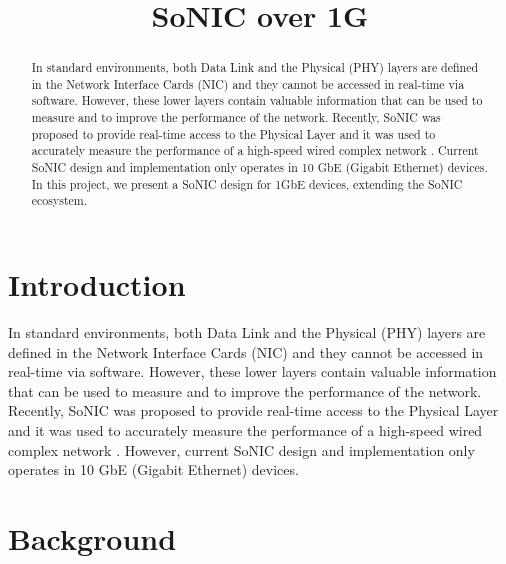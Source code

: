\documentclass[conference]{IEEEtran}
\begin{document}
%
\title{SoNIC over 1G}


\author{
}

\maketitle


\begin{abstract}

In standard environments, both Data Link and the Physical (PHY) layers are defined in the Network Interface Cards (NIC) and they cannot be accessed in real-time via software. However, these lower layers contain valuable information that can be used to measure and to improve the performance of the network. Recently, SoNIC \cite{lee2013sonic} was proposed to provide real-time access to the Physical Layer and it was used to accurately measure the performance of a high-speed wired complex network \cite{wang2014timing}. Current SoNIC design and implementation only operates in 10 GbE (Gigabit Ethernet) devices. In this project, we present a SoNIC design for 1GbE devices, extending the SoNIC ecosystem.

\end{abstract}

\IEEEpeerreviewmaketitle

\section{Introduction}

In standard environments, both Data Link and the Physical (PHY) layers are defined in the Network Interface Cards (NIC) and they cannot be accessed in real-time via software. However, these lower layers contain valuable information that can be used to measure and to improve the performance of the network. Recently, SoNIC \cite{lee2013sonic} was proposed to provide real-time access to the Physical Layer and it was used to accurately measure the performance of a high-speed wired complex network \cite{wang2014timing}. However, current SoNIC design and implementation only operates in 10 GbE (Gigabit Ethernet) devices.

\section{Background}
\end{document}
